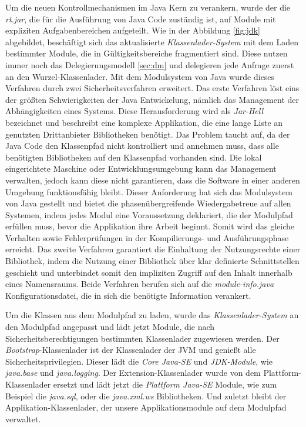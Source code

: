     Um die neuen Kontrollmechanismen im Java Kern zu verankern, wurde der die \textit{rt.jar}, die für die Ausführung von Java Code zuständig ist, auf Module mit expliziten Aufgabenbereichen aufgeteilt. Wie in der Abbildung \ref{fig:jdk} abgebildet, beschäftigt sich das aktualisierte \textit{Klassenlader-System} mit dem Laden bestimmter Module, die in Gültigkeitsbereiche fragmentiert sind. Diese nutzen immer noch das Delegierungsmodell \ref{sec:dm} und delegieren jede Anfrage zuerst an den Wurzel-Klassenlader. Mit dem Modulsystem von Java wurde dieses Verfahren durch zwei Sicherheitsverfahren erweitert. Das erste Verfahren löst eins der größten Schwierigkeiten der Java Entwickelung, nämlich das Management der Abhängigkeiten eines Systems. Diese Herausforderung wird als \textit{Jar-Hell} bezeichnet und beschreibt eine komplexe Applikation, die eine lange Liste an genutzten Drittanbieter Bibliotheken benötigt. Das Problem taucht auf, da der Java Code den Klassenpfad nicht kontrolliert und annehmen muss, dass alle benötigten Bibliotheken auf den Klassenpfad vorhanden sind. Die lokal eingerichtete Maschine oder Entwicklungsumgebung kann das Management verwalten, jedoch kann diese nicht garantieren, dass die Software in einer anderen Umgebung funktionsfähig bleibt.\newline
    Dieser Anforderung hat sich das Modulsystem von Java gestellt und bietet die phasenübergreifende Wiedergabetreue auf allen Systemen, indem jedes Modul eine Voraussetzung deklariert, die der Modulpfad erfüllen muss, bevor die Applikation ihre Arbeit beginnt. Somit wird das gleiche Verhalten sowie Fehlerprüfungen in der Kompilierungs- und Ausführungsphase erreicht.\newline
    Das zweite Verfahren garantiert die Einhaltung der Nutzungsrechte einer Bibliothek, indem die Nutzung einer Bibliothek über klar definierte Schnittstellen geschieht und unterbindet somit den impliziten Zugriff auf den Inhalt innerhalb eines Namensraums. Beide Verfahren berufen sich auf die \textit{module-info.java} Konfigurationsdatei, die in sich die benötigte Information verankert. \bigbreak

    Um die Klassen aus dem Modulpfad zu laden, wurde das \textit{Klassenlader-System} an den Modulpfad angepasst und lädt jetzt Module, die nach Sicherheitsberechtigungen bestimmten Klassenlader zugewiesen werden. Der \textit{Bootstrap}-Klassenlader ist der Klassenlader der JVM und genießt alle Sicherheitsprivilegien. Dieser lädt die \textit{Core Java-SE} und \textit{JDK-Module}, wie \textit{java.base} und \textit{java.logging}. Der Extension-Klassenlader wurde von dem Plattform-Klassenlader ersetzt und lädt jetzt die \textit{Plattform Java-SE} Module, wie zum Beispiel die \textit{java.sql}, oder die \textit{java.xml.ws} Bibliotheken. Und zuletzt bleibt der Applikation-Klassenlader, der unsere Applikationsmodule auf dem Modulpfad verwaltet. \cite{classLoadingOracle,modulMitJava9,java9modRevealed}

